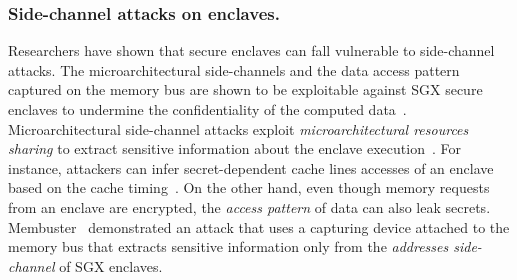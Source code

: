 \subsubsection{Side-channel attacks on enclaves.}
Researchers have shown that secure enclaves can fall vulnerable to side-channel attacks. The microarchitectural side-channels and the data access pattern captured on the memory bus are shown to be exploitable against SGX secure enclaves to undermine the confidentiality of the computed data~\cite{leaky-cauldron,sgx-cache-attack,sgx-grand-exposure,membuster}. Microarchitectural side-channel attacks exploit \emph{microarchitectural resources sharing} to extract sensitive information about the enclave execution~\cite{sgx-cache-attack,sgx-grand-exposure}. For instance, attackers can infer secret-dependent cache lines accesses of an enclave based on the cache timing~\cite{sgx-grand-exposure}. On the other hand, even though memory requests from an enclave are encrypted, the \emph{access pattern} of data can also leak secrets. Membuster~\cite{membuster} demonstrated an attack that uses a capturing device attached to the memory bus that extracts sensitive information only from the \emph{addresses side-channel} of SGX enclaves.



